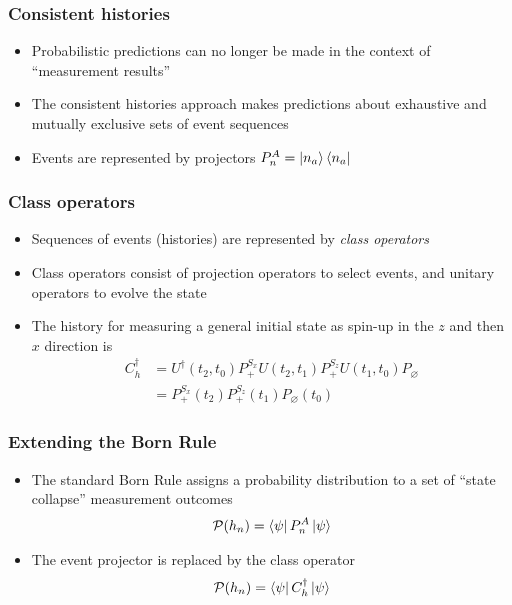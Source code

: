 \documentclass{beamer}
\begin{document}
\begin{frame}
  \frametitle{Consistent histories}
  \begin{itemize}
    \item Probabilistic predictions can no longer be made in the context of ``measurement results''
    \item The consistent histories approach makes predictions about exhaustive and mutually exclusive sets of event sequences
    \item Events are represented by projectors $P^A_n = \ket{n_a}\bra{n_a}$
  \end{itemize}
\end{frame}

\begin{frame}
\frametitle{Class operators}
  \begin{itemize}
    \item Sequences of events (histories) are represented by \textit{class operators}
    \item Class operators consist of projection operators to select events, and unitary operators to evolve the state
    \item The history for measuring a general initial state as spin-up in the $z$ and then $x$ direction is
    \begin{align*}
      C_h^\dagger &= U^\dagger(t_2, t_0) P^{S_x}_+ U(t_2, t_1) P^{S_z}_+ U(t_1, t_0) P_\varnothing \\
      &= P^{S_x}_+(t_2) P^{S_z}_+(t_1) P_\varnothing(t_0)
    \end{align*}
  \end{itemize}
\end{frame}

\begin{frame}
  \frametitle{Extending the Born Rule}
  \begin{itemize}
    \item The standard Born Rule assigns a probability distribution to a set of ``state collapse'' measurement outcomes
    \begin{align*}
      \mathcal{P}(h_n) = \bra{\psi} P^A_n \ket{\psi}
    \end{align*}
    \item The event projector is replaced by the class operator
    \begin{align*}
      \mathcal{P}(h_n) = \bra{\psi} C_h^\dagger \ket{\psi}
    \end{align*}
  \end{itemize}
\end{frame}
\end{document}
